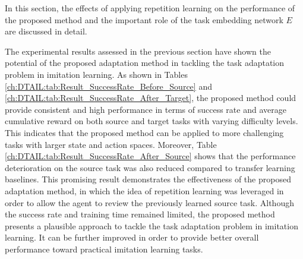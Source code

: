 In this section,
the effects of applying repetition learning on the performance of the proposed method and the important role of the task embedding network $E$ are discussed in detail.


The experimental results assessed in the previous section have shown the potential of the proposed adaptation method in tackling the task adaptation problem in imitation learning.
As shown in Tables \ref{ch:DTAIL:tab:Result_SuccessRate_Before_Source} and \ref{ch:DTAIL:tab:Result_SuccessRate_After_Target},
the proposed method could provide consistent and high performance in terms of success rate and average cumulative reward on both source and target tasks with varying difficulty levels.
This indicates that the proposed method can be applied to more challenging tasks with larger state and action spaces.
Moreover,
Table \ref{ch:DTAIL:tab:Result_SuccessRate_After_Source} shows that the performance deterioration on the source task was also reduced compared to transfer learning baselines.
This promising result demonstrates the effectiveness of the proposed adaptation method,
in which the idea of repetition learning was leveraged in order to allow the agent to review the previously learned source task.
Although the success rate and training time remained limited,
the proposed method presents a plausible approach to tackle the task adaptation problem in imitation learning.
It can be further improved in order to provide better overall performance toward practical imitation learning tasks.



